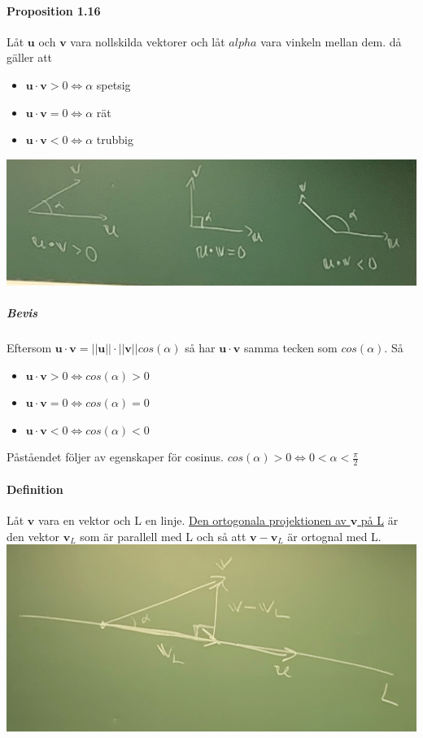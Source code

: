 \paragraph{Proposition 1.16} Låt $\bm{u}$ och $\bm{v}$ vara nollskilda vektorer och låt $alpha$ vara vinkeln mellan dem.
då gäller att
\begin{itemize}
    \item $\bm{u} \cdot \bm{v} > 0 \Leftrightarrow \alpha$ spetsig
    \item $\bm{u} \cdot \bm{v} = 0\Leftrightarrow \alpha$ rät
    \item $\bm{u} \cdot \bm{v} < 0\Leftrightarrow \alpha$ trubbig
\end{itemize}
\includegraphics[scale=0.15]{imgs/22-01-20-img03.jpg}
\subparagraph{Bevis} Eftersom $\bm{u} \cdot \bm{v} = ||\bm{u}|| \cdot ||\bm{v}||cos(\alpha)$ så har $\bm{u} \cdot \bm{v}$ samma tecken som $cos(\alpha)$.
Så
\begin{itemize}
    \item $\bm{u} \cdot \bm{v} > 0 \Leftrightarrow cos(\alpha) > 0$
    \item $\bm{u} \cdot \bm{v} = 0 \Leftrightarrow cos(\alpha) = 0$
    \item $\bm{u} \cdot \bm{v} < 0 \Leftrightarrow cos(\alpha) < 0$
\end{itemize}
Påståendet följer av egenskaper för cosinus. $cos(\alpha) > 0 \Leftrightarrow 0 < \alpha < \frac{\pi}{2}$

\paragraph{Definition} Låt $\bm{v}$ vara en vektor och L en linje.
\underline{Den ortogonala projektionen av $\bm{v}$ på L} är den vektor $\bm{v}_{L}$ som är parallell med L och så att $\bm{v}-\bm{v}_{L}$ är ortognal med L.\\
\includegraphics[scale=0.15]{imgs/22-01-20-img04.jpg}

